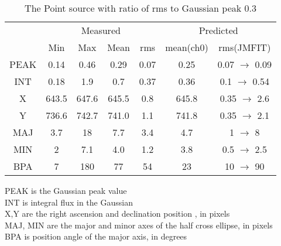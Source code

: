 \begin{table}
\caption{The Point source with ratio of rms to Gaussian peak  0.3}
\label{tab:2}
\begin{center}
\begin{tabular}{|c| c c c c|c c|} \hline
& \multicolumn{4}{c|}{Measured} &\multicolumn{2}{c|}{Predicted}\\ \cline{2-7}
       & Min& Max& Mean &rms & mean(ch0)& rms(JMFIT)\\
 \hline
PEAK  & 0.14    & 0.46   & 0.29  & 0.07 & 0.25  &0.07 $\rightarrow$ 0.09\\
INT   & 0.18    &1.9   & 0.7   & 0.37 & 0.36   &0.1 $\rightarrow$ 0.54\\
X     & 643.5   & 647.6 & 645.5 & 0.8 & 645.8 &0.35 $\rightarrow$ 2.6\\
Y     & 736.6   & 742.7 & 741.0 & 1.1 & 741.8 &0.35 $\rightarrow$ 2.1\\
MAJ   & 3.7    & 18  & 7.7  & 3.4 & 4.7  &1 $\rightarrow$ 8 \\
MIN   & 2    & 7.1  & 4.0  & 1.2 & 3.8  &0.5 $\rightarrow$ 2.5\\
BPA   & 7      &180     & 77    & 54   & 23    & 10 $\rightarrow$ 90\\
\hline
\end{tabular}
\end{center}
{\small
PEAK is the Gaussian peak value \\
INT is integral flux in the Gaussian \\
X,Y are the right ascension and declination position , in pixels \\
MAJ, MIN are the major and minor axes of the half cross ellipse, in pixels \\
BPA is position angle of the major axis, in degrees\\
}
\end{table}
